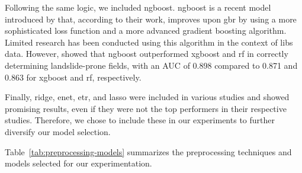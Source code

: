 Following the same logic, we included \gls{ngboost}. 
\gls{ngboost} is a recent model introduced by \citet{duan_ngboost_2020} that, according to their work, improves upon \gls{gbr} by using a more sophisticated loss function and a more advanced gradient boosting algorithm.
Limited research has been conducted using this algorithm in the context of \gls{libs} data. 
However, \citet{ngboost_landslide} showed that \gls{ngboost} outperformed \gls{xgboost} and \gls{rf} in correctly determining landslide-prone fields, with an AUC of 0.898 compared to 0.871 and 0.863 for \gls{xgboost} and \gls{rf}, respectively.

Finally, \gls{ridge}, \gls{enet}, \gls{etr}, and \gls{lasso} were included in various studies and showed promising results, even if they were not the top performers in their respective studies.
Therefore, we chose to include these in our experiments to further diversify our model selection. 

Table~\ref{tab:preprocessing-models} summarizes the preprocessing techniques and models selected for our experimentation.

